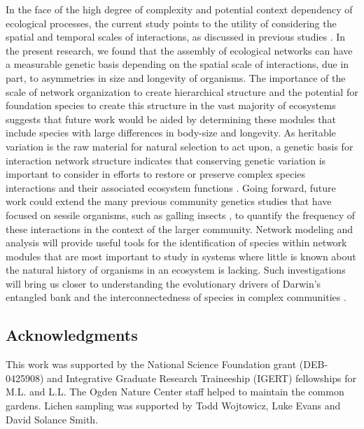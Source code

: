 \documentclass[fleqn,12pt]{olplainarticle}
\begin{document}
In the face of the high degree of complexity and potential context
dependency of ecological processes, the current study points to the
utility of considering the spatial and temporal scales of
interactions, as discussed in previous studies \citep{Bangert2006,
  Zook2010, Zytynska2012}. In the present research, we found that the
assembly of ecological networks can have a measurable genetic basis
depending on the spatial scale of interactions, due in part, to
asymmetries in size and longevity of organisms. The importance of the
scale of network organization to create hierarchical structure
\citep{Guimaraes2020TheOrganization} and the potential for foundation
species to create this structure in the vast majority of ecosystems
\citep{Ellison2005, Whitham2006a} suggests that future work would be
aided by determining these modules that include species with large
differences in body-size and longevity. As heritable variation is the
raw material for natural selection to act upon, a genetic basis for
interaction network structure indicates that conserving genetic
variation is important to consider in efforts to restore or preserve
complex species interactions and their associated ecosystem functions
\citep{ Whitham2012, Evans2013,
  Whitham2020IntraspecificEvolution}. Going forward, future work could
extend the many previous community genetics studies that have focused
on sessile organisms, such as galling insects
\citep{Bailey2005ImportanceInteractions, Whitham2006a, Crutsinger2014,
  Smith2011, Keith2017}, to quantify the frequency of these
interactions in the context of the larger community. Network modeling
and analysis will provide useful tools for the identification of
species within network modules that are most important to study in
systems where little is known about the natural history of organisms
in an ecosystem is lacking.  Such investigations will bring us closer
to understanding the evolutionary drivers of Darwin's entangled bank
and the interconnectedness of species in complex communities
\citep{Darwin1859, Dattilo2016fix}.


\subsection*{Acknowledgments}

This work was supported by the National Science Foundation grant
(DEB-0425908) and Integrative Graduate Research Traineeship (IGERT)
fellowships for M.L. and L.L. The Ogden Nature Center staff helped to
maintain the common gardens. Lichen sampling was supported by Todd
Wojtowicz, Luke Evans and David Solance Smith.
\end{document}
